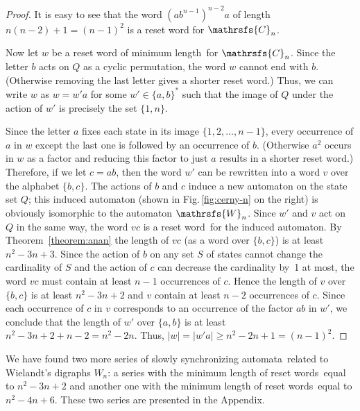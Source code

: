 \documentclass[11pt]{llncs}
\newcommand{\sa}{synchronizing automata}
\newcommand{\sw}{reset word}
\newcommand{\sws}{reset words}
\newcommand{\ssw}{reset word of minimum length}
\begin{document}
\begin{proof}
It is easy to see that the word $(ab^{n-1})^{n-2}a$ of length
$n(n-2)+1=(n-1)^2$ is a reset word for $\mathrsfs{C}_n$.

Now let $w$ be a \ssw\ for $\mathrsfs{C}_n$. Since the letter $b$
acts on $Q$ as a cyclic permutation, the word $w$ cannot end with $b$.
(Otherwise removing the last letter gives a shorter \sw.) Thus, we can
write $w$ as $w = w'a$ for some $w'\in\{a,b\}^*$ such that the image
of $Q$ under the action of $w'$ is precisely the set $\{1,n\}$.

Since the letter $a$ fixes each state in its image $\{1,2,\dots,n-1\}$,
every occurrence of $a$ in $w$ except the last one is followed by an
occurrence of $b$. (Otherwise $a^2$ occurs in $w$ as a factor and
reducing this factor to just $a$ results in a shorter \sw.) Therefore,
if we let $c=ab$, then the word $w'$ can be rewritten into a word $v$
over the alphabet $\{b,c\}$. The actions of $b$ and $c$ induce
a new automaton on the state set $Q$; this induced automaton (shown in
Fig.\,\ref{fig:cerny-n} on the right) is obviously isomorphic to the
automaton $\mathrsfs{W}_n$. Since $w'$ and $v$ act on $Q$ in the same way,
the word $vc$ is a \sw\ for the induced automaton. By Theorem~\ref{theorem:anan}
the length of $vc$ (as a word over $\{b,c\}$) is at least $n^2-3n+3$.
Since the action of $b$ on any set $S$ of states cannot change the
cardinality of $S$ and the action of $c$ can decrease the cardinality
by~1 at most, the word $vc$ must contain at least $n-1$ occurrences of
$c$. Hence the length of $v$ over $\{b,c\}$ is at least $n^2-3n+2$ and
$v$ contain at least $n-2$ occurrences of $c$. Since each occurrence of
$c$ in $v$ corresponds to an occurrence of the factor $ab$ in $w'$, we
conclude that the length of $w'$ over $\{a,b\}$ is at least $n^2-3n+2+n-2=n^2-2n$.
Thus, $|w|=|w'a|\ge n^2-2n+1=(n-1)^2$.
\end{proof}

We have found two more series of slowly \sa\ related to Wielandt's digraphs
$W_n$: a series with the minimum length of \sws\ equal to $n^2-3n+2$ and
another one with the minimum length of \sws\ equal to $n^2-4n+6$. These
two series are presented in the Appendix.
\end{document}

